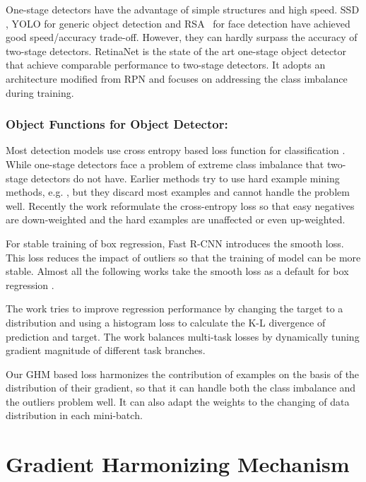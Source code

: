 \documentclass[letterpaper]{article} \usepackage{aaai19}  \usepackage{times}  \usepackage{helvet}  \usepackage{courier}  \usepackage{url}  \usepackage{graphicx}  \usepackage{amsmath,amssymb}
\begin{document}
 One-stage detectors have the advantage of simple structures and high speed. SSD \cite{ssd,dssd}, YOLO \cite{yolo,yolov2,yolov3} for generic object detection and RSA~\cite{songbeyond,liu2017recurrent} for face detection have achieved good speed/accuracy trade-off. However, they can hardly surpass the accuracy of two-stage detectors. RetinaNet \cite{focal} is the state of the art one-stage object detector that achieve comparable performance to two-stage detectors. It adopts an architecture modified from RPN \cite{faster} and focuses on addressing the class imbalance during training.

\subsubsection{Object Functions for Object Detector:}
Most detection models use cross entropy based loss function for classification \cite{fast,faster,ssd,rfcn,fpn,mask}. While one-stage detectors face a problem of extreme class imbalance that two-stage detectors do not have. Earlier methods try to use hard example mining methods, e.g. \cite{ohem,casdpm}, but they discard most examples and cannot handle the problem well. Recently the work \cite{focal} reformulate the cross-entropy loss so that easy negatives are down-weighted and the hard examples are unaffected or even up-weighted. 

For stable training of box regression, Fast R-CNN \cite{fast} introduces the smooth  loss. This loss reduces the impact of outliers so that the training of model can be more stable. Almost all the following works take the smooth  loss as a default for box regression \cite{faster,ssd,rfcn,fpn,mask}. 

The work \cite{dist} tries to improve regression performance by changing the target to a distribution and using a histogram loss to calculate the K-L divergence of prediction and target. The work \cite{grad} balances multi-task losses by dynamically tuning gradient magnitude of different task branches.

Our GHM based loss harmonizes the contribution of examples on the basis of the distribution of their gradient, so that it can handle both the class imbalance and the outliers problem well. It can also adapt the weights to the changing of data distribution in each mini-batch.


\section{Gradient Harmonizing Mechanism}
\label{sec:ghm}
\end{document}
